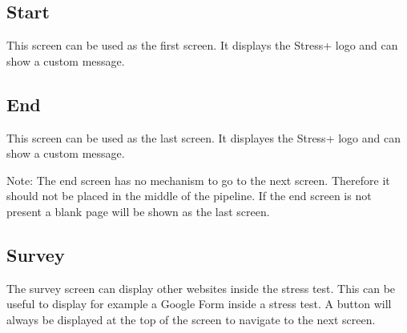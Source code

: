 \subsection{Start}
\label{sec:screens-start}
This screen can be used as the first screen.
It displays the Stress+ logo and can show a custom message.

\subsection{End}
\label{sec:screens-end}
This screen can be used as the last screen.
It displayes the Stress+ logo and can show a custom message.

Note: The end screen has no mechanism to go to the next screen. Therefore it should not be placed in the middle of the pipeline.
If the end screen is not present a blank page will be shown as the last screen.

\subsection{Survey}
\label{sec:screens-survey}
The survey screen can display other websites inside the stress test. 
This can be useful to display for example a Google Form inside a stress test.
A button will always be displayed at the top of the screen to navigate to the next screen.
